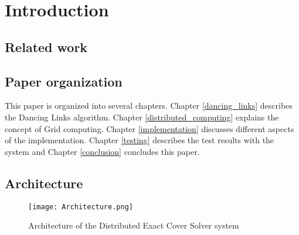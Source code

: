 
\chapter{Introduction}


\section{Related work}


\section{Paper organization}

This paper is organized into several chapters. Chapter \ref{dancing_links} describes the Dancing Links algorithm. Chapter \ref{distributed_computing} explains the concept of Grid computing. Chapter \ref{implementation} discusses different aspects of the implementation. Chapter \ref{testing} describes the test results with the system and Chapter \ref{conclusion} concludes this paper.


\section{Architecture}


\begin{figure}[htb]
	\centering 
	\texttt{[image: Architecture.png]}
	\caption{Architecture of the Distributed Exact Cover Solver system}
	\label{fig:architecture}
\end{figure}

